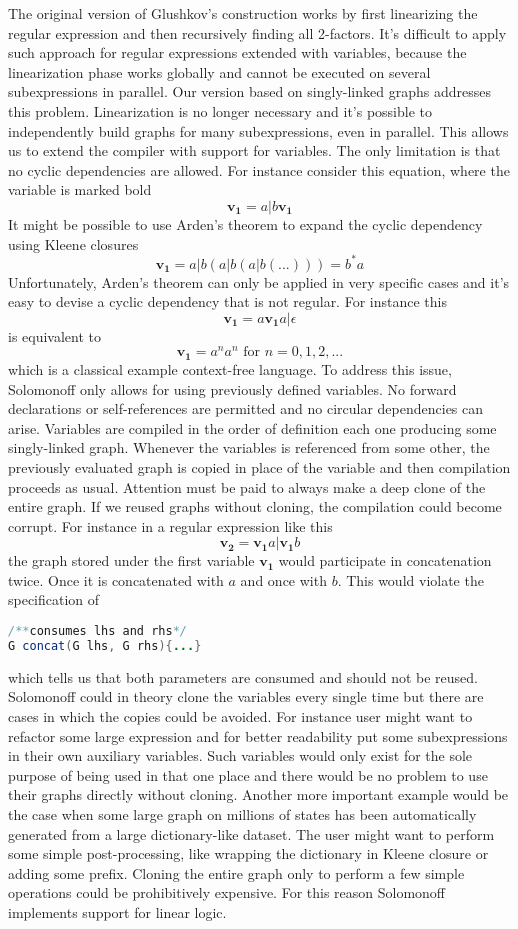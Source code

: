 \documentclass[12pt]{article}
\begin{document}
The original version\cite{GLUSHKOV} of Glushkov's construction works by first linearizing the regular expression and then recursively finding all 2-factors. It's difficult to apply such approach for regular expressions extended with variables, because the linearization phase works globally and cannot be executed on several subexpressions in parallel. Our version based on singly-linked graphs addresses this problem. Linearization is no longer necessary and it's possible to independently build graphs for many subexpressions, even in parallel. This allows us to extend the compiler with support for variables. The only limitation is that no cyclic dependencies are allowed. For instance consider this equation, where the variable is marked bold
\[
	\boldsymbol{v_1} = a|b\boldsymbol{v_1}  
\]
It might be possible to use Arden's theorem to expand the cyclic dependency using Kleene closures
\[
	\boldsymbol{v_1} = a|b(a|b(a|b(...)))=b^*a
\]
Unfortunately, Arden's theorem can only be applied  in very specific cases and it's easy to devise a cyclic dependency that is not regular. For instance this
\[
	\boldsymbol{v_1} = a\boldsymbol{v_1}a|\epsilon 
\]
is equivalent to
\[
\boldsymbol{v_1} = a^na^n \mbox{ for } n=0,1,2,...
\]
which is a classical example context-free language. To address this issue, Solomonoff only allows for using previously defined variables. No forward declarations or self-references are permitted and no circular dependencies can arise. 
Variables are compiled in the order of definition each one producing some singly-linked graph. Whenever the variables is referenced from some other, the previously evaluated graph is copied in place of the variable and then compilation proceeds as usual. Attention must be paid to always make a deep clone of the entire graph. If we reused graphs without cloning, the compilation could become corrupt. For instance in a regular expression like this
\[
\boldsymbol{v_2} = \boldsymbol{v_1}a|\boldsymbol{v_1}b
\]
the graph stored under the first variable $\boldsymbol{v_1}$ would participate in concatenation twice. Once it is concatenated with $a$ and once with $b$. This would violate the specification of
\begin{lstlisting}[language=java]
/**consumes lhs and rhs*/
G concat(G lhs, G rhs){...}
\end{lstlisting}
which tells us that both parameters are consumed and should not be reused. Solomonoff could in theory clone the variables every single time but there are cases in which the copies could be avoided. For instance user might want to refactor some large expression and for better readability put some subexpressions in their own auxiliary variables. Such variables would only exist for the sole purpose of being used in that one place and there would be no problem to use their graphs directly without cloning. Another more important example would be the case when some large graph on millions of states has been automatically generated from a large dictionary-like dataset. The user might want to perform some simple post-processing, like wrapping the dictionary in Kleene closure or adding some prefix. Cloning the entire graph only to perform a few simple operations could be prohibitively expensive. For this reason Solomonoff implements support for linear logic.
\end{document}
